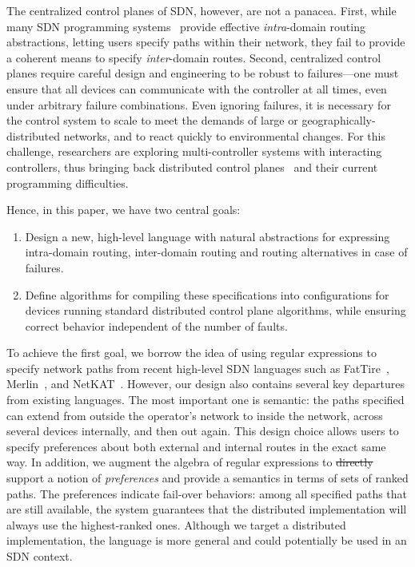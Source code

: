 \documentclass{sig-alternate-10pt}
\providecommand{\DIFdel}[1]{{\protect\color{red}\sout{#1}}}                      %
\providecommand{\DIFdelbegin}{} %
\providecommand{\DIFdelend}{} %
\begin{document}
The centralized control planes of SDN, however, are not a panacea.
First, while many SDN programming systems~\cite{sdn-languages} provide effective \emph{intra}-domain routing
abstractions, letting users specify paths within their network,
they fail to provide a coherent means to specify \emph{inter}-domain routes.
Second, centralized control planes
require careful design and engineering to be robust to failures---one must ensure that all devices can communicate with the controller at all times, even under arbitrary failure combinations. Even ignoring failures, it is necessary for the control system to
scale to meet the demands of large or geographically-distributed networks,
and to react quickly
to environmental changes. For this challenge, researchers are exploring
multi-controller systems with interacting controllers, thus bringing back distributed
control planes~\cite{mccauley2013extending,onos} and their current programming difficulties.

Hence, in this paper, we have two central goals:
\begin{enumerate}
\item Design a new, high-level language with natural abstractions
for expressing intra-domain routing, inter-domain
routing and routing alternatives in case of failures.
\item Define algorithms for compiling these specifications into
configurations for devices running standard
distributed control plane algorithms, while ensuring correct behavior
independent of the number of faults.
\end{enumerate}

To achieve the first goal, we borrow the idea of using regular
expressions to specify network paths from
recent high-level SDN languages such as FatTire~\cite{fattire},
Merlin~\cite{foster:merlin}, and
NetKAT~\cite{netkat}.  However, our design also contains several key
departures from existing languages.  The most important one is semantic:  the paths specified
can extend from outside the operator's network to inside
the network, across several devices internally, and then out again. This design
choice allows users to specify preferences about both external and internal
routes in the exact same way.
In addition, we augment the algebra
of regular expressions to \DIFdelbegin \DIFdel{directly }\DIFdelend support a notion of {\em preferences} and provide a semantics in terms of sets of ranked paths. The preferences indicate fail-over behaviors:  among all specified paths that are still available,
the system guarantees that the distributed implementation will always use the highest-ranked ones.
Although we target a distributed implementation, the language is more general and could potentially be used in an SDN context.
\end{document}
